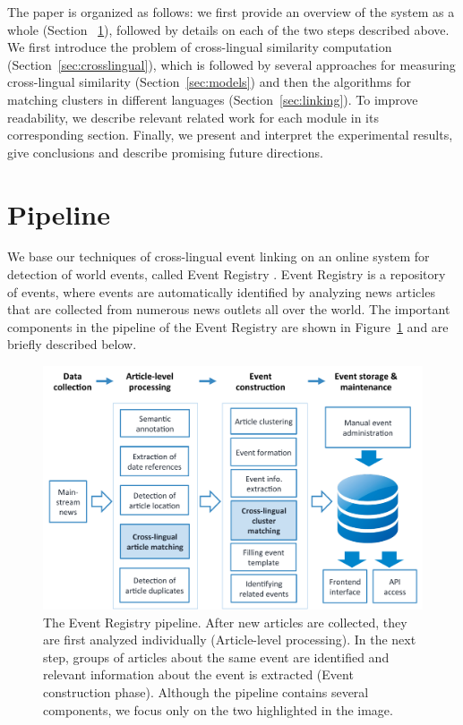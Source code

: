 \documentclass[twoside,11pt]{article}
\begin{document}
The paper is organized as follows: we first provide an overview of the system as a whole (Section ~\ref{sec:pipeline}), followed by details on each of the two steps described above. We first introduce the problem of cross-lingual similarity computation (Section~\ref{sec:crosslingual}), which is followed by several approaches for measuring cross-lingual similarity (Section~\ref{sec:models}) and then the algorithms for matching clusters in different languages (Section~\ref{sec:linking}).  To improve readability, we describe relevant related work for each module in its corresponding section. Finally, we present and interpret the experimental results, give conclusions and describe promising future directions.


\section{Pipeline}\label{sec:pipeline}

We base our techniques of cross-lingual event linking on an online system for detection of world events, called Event Registry . Event Registry is a repository of events, where events are automatically identified by analyzing news articles that are collected from numerous news outlets all over the world. The important components in the pipeline of the Event Registry are shown in Figure~\ref{fig:erpipeline} and are briefly described below.

\begin{figure}[tbp]
\centering
\includegraphics[width=\textwidth]{pipeline.pdf}
\caption{\label{fig:erpipeline}  The Event Registry pipeline. After new articles are collected, they are first analyzed individually (Article-level processing). In the next step, groups of articles about the same event are identified and relevant information about the event is extracted (Event construction phase). Although the pipeline contains several components, we focus only on the two highlighted in the image.}
\end{figure}
\end{document}
